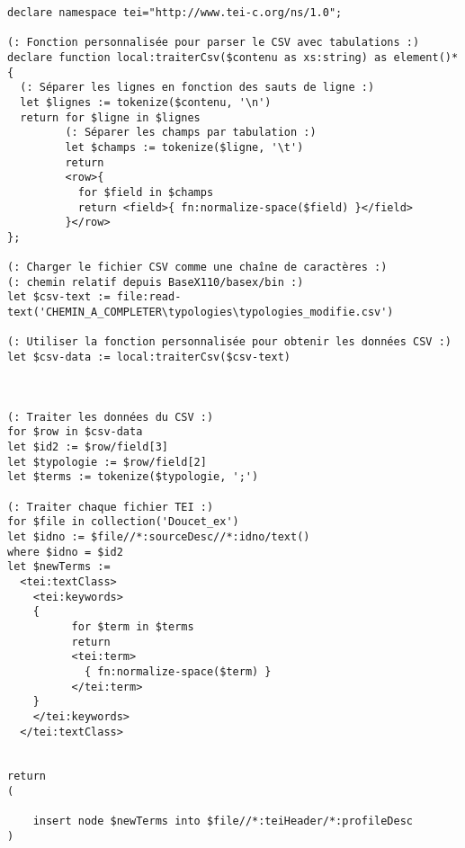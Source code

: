 \begin{verbatim}
declare namespace tei="http://www.tei-c.org/ns/1.0";

(: Fonction personnalisée pour parser le CSV avec tabulations :)
declare function local:traiterCsv($contenu as xs:string) as element()* {
  (: Séparer les lignes en fonction des sauts de ligne :)
  let $lignes := tokenize($contenu, '\n') 
  return for $ligne in $lignes
         (: Séparer les champs par tabulation :)
         let $champs := tokenize($ligne, '\t') 
         return 
         <row>{
           for $field in $champs
           return <field>{ fn:normalize-space($field) }</field>
         }</row>
};

(: Charger le fichier CSV comme une chaîne de caractères :)
(: chemin relatif depuis BaseX110/basex/bin :)
let $csv-text := file:read-text('CHEMIN_A_COMPLETER\typologies\typologies_modifie.csv')

(: Utiliser la fonction personnalisée pour obtenir les données CSV :)
let $csv-data := local:traiterCsv($csv-text)



(: Traiter les données du CSV :)
for $row in $csv-data
let $id2 := $row/field[3] 
let $typologie := $row/field[2] 
let $terms := tokenize($typologie, ';')

(: Traiter chaque fichier TEI :)
for $file in collection('Doucet_ex')
let $idno := $file//*:sourceDesc//*:idno/text()
where $idno = $id2
let $newTerms := 
  <tei:textClass>
    <tei:keywords>
    {
          for $term in $terms
          return 
          <tei:term>
            { fn:normalize-space($term) }
          </tei:term>
    }
    </tei:keywords>
  </tei:textClass>


return
(
  
    insert node $newTerms into $file//*:teiHeader/*:profileDesc
)
\end{verbatim}